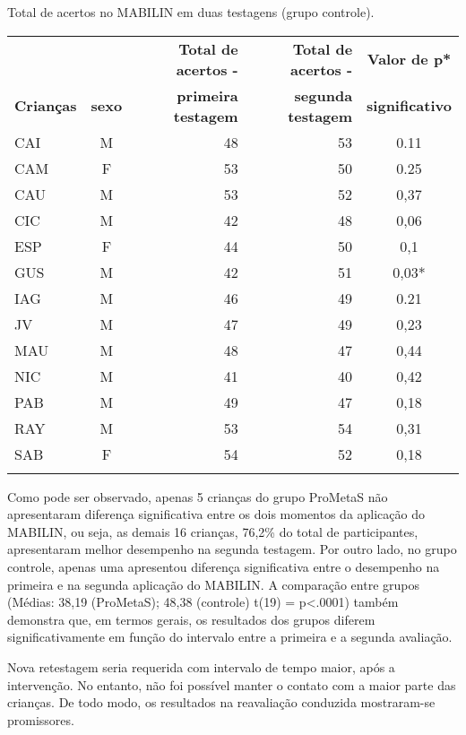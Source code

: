 \documentclass[output=paper,colorlinks,citecolor=brown,booklanguage=portuguese]{langscibook}
\begin{document}
\begin{Tabela}[H]
\caption{{ Total de acertos no MABILIN em duas testagens (grupo controle).}}
\label{tab:cap14tab2}


\begin{tabular}{lcrrS}
\lsptoprule
  & & \textbf{Total de acertos -} & \textbf{Total de acertos -} & \textbf{Valor de p*} \\
\textbf{Crianças} &\textbf{sexo} & \textbf{primeira testagem} & \textbf{segunda testagem} & \textbf{significativo}\\
\addlinespace
\midrule
CAI & M&	48&	53&	0.11\\
\addlinespace
CAM & F&	53&	50&	0.25\\
\addlinespace
CAU & M&	53&	52&	0,37\\
\addlinespace
CIC & M&	42&	48&	 0,06\\
\addlinespace
ESP & F&	44&	50&	0,1\\
\addlinespace
GUS & M&	42&	51&	  0,03*\\
\addlinespace
IAG & M&	46	&49	&0.21\\
\addlinespace
JV & M&	47&	49	&0,23\\
\addlinespace
MAU & M&	48&	47&	0,44\\
\addlinespace
NIC & M&	41&	40&	0,42\\
\addlinespace
PAB & M&	49	&47&	0,18\\
\addlinespace
RAY & M&	53&	54&	0,31\\
\addlinespace
SAB & F&	54&	52&	0,18\\
\addlinespace
\lspbottomrule
\end{tabular}
\end{Tabela}


Como pode ser observado, apenas 5 crianças do grupo ProMetaS não apresentaram diferença significativa entre os dois momentos da aplicação do MABILIN, ou seja, as demais 16 crianças, 76,2\% do total de participantes, apresentaram melhor desempenho na segunda testagem. Por outro lado, no grupo controle, apenas uma apresentou diferença significativa entre o desempenho na primeira e na segunda aplicação do MABILIN. A comparação entre grupos (Médias: 38,19 (ProMetaS); 48,38 (controle) t(19) = p<.0001) também demonstra que,  em termos gerais, os resultados dos grupos diferem significativamente em função do intervalo entre a primeira e a segunda avaliação. 

Nova retestagem seria requerida com intervalo de tempo maior, após a intervenção. No entanto, não foi possível manter o contato com a maior parte das crianças. De todo modo, os resultados na reavaliação conduzida mostraram-se promissores.
\end{document}
